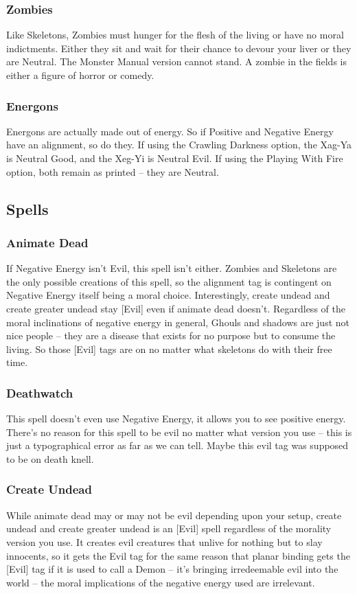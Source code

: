 \subsubsection{Zombies} Like Skeletons, Zombies must hunger for the flesh of the living or have no moral indictments. Either they sit and wait for their chance to devour your liver or they are Neutral. The Monster Manual version cannot stand. A zombie in the fields is either a figure of horror or comedy.

\subsubsection{Energons} Energons are actually made out of energy. So if Positive and Negative Energy have an alignment, so do they. If using the Crawling Darkness option, the Xag-Ya is Neutral Good, and the Xeg-Yi is Neutral Evil. If using the Playing With Fire option, both remain as printed -- they are Neutral.

\subsection{Spells}

\subsubsection{Animate Dead} If Negative Energy isn't Evil, this spell isn't either. Zombies and Skeletons are the only possible creations of this spell, so the alignment tag is contingent on Negative Energy itself being a moral choice. Interestingly, create undead and create greater undead stay [Evil] even if animate dead doesn't. Regardless of the moral inclinations of negative energy in general, Ghouls and shadows are just not nice people -- they are a disease that exists for no purpose but to consume the living. So those [Evil] tags are on no matter what skeletons do with their free time.

\subsubsection{Deathwatch} This spell doesn't even use Negative Energy, it allows you to see positive energy. There's no reason for this spell to be evil no matter what version you use -- this is just a typographical error as far as we can tell. Maybe this evil tag was supposed to be on death knell.

\subsubsection{Create Undead} While animate dead may or may not be evil depending upon your setup, create undead and create greater undead is an [Evil] spell regardless of the morality version you use. It creates evil creatures that unlive for nothing but to slay innocents, so it gets the Evil tag for the same reason that planar binding gets the [Evil] tag if it is used to call a Demon -- it's bringing irredeemable evil into the world -- the moral implications of the negative energy used are irrelevant.
